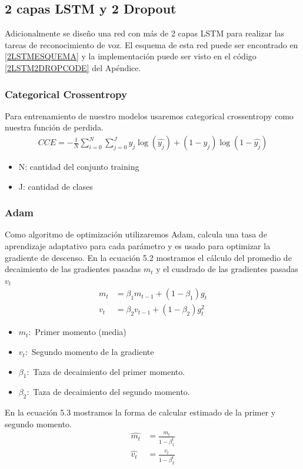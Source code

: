 \subsection{2 capas LSTM y 2 Dropout}
Adicionalmente se diseño una red con más de 2 capas LSTM para realizar las tareas de reconocimiento de voz. El esquema de esta red puede ser encontrado en \ref{2LSTMESQUEMA} y la implementación puede ser visto en el código \ref{2LSTM2DROPCODE} del Apéndice.

\subsubsection{Categorical Crossentropy}

Para entrenamiento de nuestro modelos usaremos categorical crossentropy como nuestra función de perdida.
	\begin{equation}
\label{CCE}
\begin{aligned}
CCE=-\frac{1}{N}\sum_{i=0}^{N}\sum_{j=0}^{J} y_{j}\log(\hat{y_{j}})+(1-y_{j})\log(1-\hat{y_{j}})
\end{aligned}
\end{equation}
\begin{itemize}
	\item N: cantidad del conjunto training
	\item J: cantidad de clases
\end{itemize}

\subsubsection{Adam}
Como algoritmo de optimización utilizaremos Adam, calcula una tasa de aprendizaje adaptativo para cada parámetro y es usado para optimizar la gradiente de descenso.
En la ecuación 5.2 mostramos el cálculo del promedio de decaimiento de las gradientes pasadas $m_{t}$ y el cuadrado de las gradientes pasadas $v_{t}$
\begin{equation}
\label{adam1}
\begin{aligned}
m_{t} &= \beta_{1} m_{t-1} +(1-\beta_{1})g_{t} \\
v_{t} &= \beta_{2} v_{t-1} +(1-\beta_{2})g_{t}^2
\end{aligned}
\end{equation}

\begin{itemize}
	\item $m_{t}:$ Primer momento (media)
	\item $v_{t}:$ Segundo momento de la gradiente
	\item $\beta_{1}:$ Taza de decaimiento del primer momento.
	\item $\beta_{2}:$ Taza de decaimiento del segundo momento.
\end{itemize}
En la ecuación 5.3 mostramos la forma de calcular estimado de la primer y segundo momento.
\begin{equation}
\label{adam2}
\begin{aligned}
\hat{m_{t}}&= \frac{m_{t}}{1-\beta_{1}^{t}} \\
\hat{v_{t}} &= \frac{v_{t}}{1-\beta_{2}^{t}}
\end{aligned}
\end{equation}

